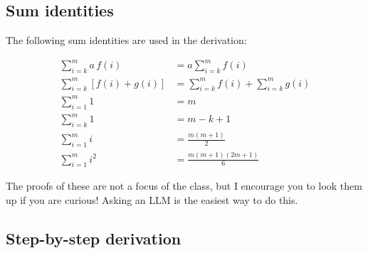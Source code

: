 \documentclass[11pt]{article}
\begin{document}
\subsection{Sum identities}

The following sum identities are used in the derivation:

\begin{align}
  \sum_{i=k}^m a\,f(i) &= a \sum_{i=k}^m f(i)
    \tag{ID1} \label{id:const} \\[0.3em]
  \sum_{i=k}^m \left[ f(i) + g(i) \right] &= \sum_{i=k}^m f(i) + \sum_{i=k}^m g(i)
    \tag{ID2} \label{id:split} \\[0.3em]
  \sum_{i=1}^m 1 &= m
    \tag{ID3} \label{id:ones} \\[0.3em]
  \sum_{i=k}^{m} 1 &= m - k + 1
    \tag{ID4} \label{id:count} \\[0.3em]
  \sum_{i=1}^m i &= \frac{m(m+1)}{2}
    \tag{ID5} \label{id:lin} \\[0.3em]
  \sum_{i=1}^m i^2 &= \frac{m(m+1)(2m+1)}{6}
    \tag{ID6} \label{id:sq}
\end{align}

The proofs of these are not a focus of the class, but I encourage you to look them up if you are curious! Asking an LLM is the easiest way to do this.

\subsection{Step-by-step derivation}
\end{document}
